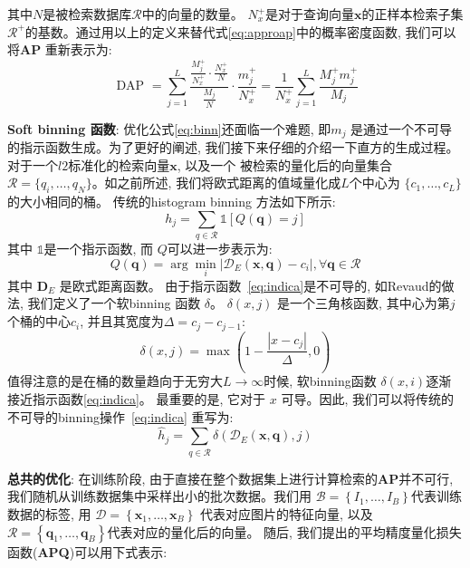 其中$N$是被检索数据库$\mathcal{R}$中的向量的数量。 $N_{x}^{+}$是对于查询向量$\mathbf{x}$的正样本检索子集 $\mathcal{R}^{+}$的基数。通过用以上的定义来替代式\ref{eq:approap}中的概率密度函数, 我们可以将\textbf{AP} 重新表示为: 
\begin{equation}
    \label{eq:binn}
    \text { DAP }=\sum_{j=1}^{L} \frac{\frac{M_{j}^{+}}{N_{x}^{+}} \cdot \frac{N_{x}^{+}}{N}}{\frac{M_{j}}{N}} \cdot \frac{m_{j}^{+}}{N_{x}^{+}}=\frac{1}{N_{x}^{+}} \sum_{j=1}^{L} \frac{M_{j}^{+} m_{j}^{+}}{M_{j}}
    \end{equation} \par
\textbf{Soft binning 函数}: 优化公式\ref{eq:binn}还面临一个难题, 即$m_j$ 是通过一个不可导的指示函数生成。为了更好的阐述, 我们接下来仔细的介绍一下直方的生成过程。 对于一个$l2$标准化的检索向量$\mathbf{x}$, 以及一个 被检索的量化后的向量集合$\mathcal{R} = \{q_i,\ldots,q_N\}$。如之前所述, 我们将欧式距离的值域量化成$L$个中心为 $\{c_1, \ldots, c_L\}$的大小相同的桶。 传统的histogram binning 方法如下所示:
\begin{equation}
    \label{eq:indica}
    h_{j}=\sum_{q \in \mathcal{R}} \mathbb{1}\left[Q(\mathbf{q})=j\right]
    \end{equation}
其中 $\mathbb{1}$是一个指示函数, 而 $Q$可以进一步表示为:
\begin{equation}
    Q(\mathbf{q})=\arg \min _{i}\left|\mathcal{D}_E\left(\mathbf{x}, \mathbf{q}\right)-c_{i}\right|, \forall \mathbf{q} \in \mathcal{R} 
\end{equation}
其中 $\mathbf{D}_E$ 是欧式距离函数。 由于指示函数~\ref{eq:indica}是不可导的, 如Revaud的做法\cite{revaud2019learning}, 我们定义了一个软binning 函数  $\delta$。 $\delta(x,j)$ 是一个三角核函数, 其中心为第$j$个桶的中心$c_i$, 并且其宽度为$\Delta = c_j - c_{j-1}$:
\begin{equation}
    \delta(x, j)=\max \left(1-\frac{\left|x-c_{j}\right|}{\Delta}, 0\right)
\end{equation}
值得注意的是在桶的数量趋向于无穷大$L \rightarrow \infty $时候, 软binning函数 $\delta(x,i)$逐渐接近指示函数\ref{eq:indica}。 最重要的是, 它对于 $x$ 可导。因此, 我们可以将传统的不可导的binning操作~\ref{eq:indica} 重写为:
\begin{equation}
    \label{eq:indicasoft}
    \hat{h}_{j}=\sum_{q \in \mathcal{R}} \delta(\mathcal{D}_E(\mathbf{x},\mathbf{q}), j)
\end{equation} \par
\textbf{总共的优化}: 在训练阶段, 由于直接在整个数据集上进行计算检索的\textbf{AP}并不可行, 我们随机从训练数据集中采样出小的批次数据。我们用 $\mathcal{B}=\left\{I_{1}, \ldots, I_{B}\right\}$代表训练数据的标签, 用 $\mathcal{D} = \left\{ \mathbf{x}_{1}, \ldots, \mathbf{x}_{B} \right\}$ 代表对应图片的特征向量, 以及$\mathcal{R} = \left\{ \mathbf{q}_{1}, \ldots, \mathbf{q}_{B} \right\}$代表对应的量化后的向量。 随后, 我们提出的平均精度量化损失函数(\textbf{APQ})可以用下式表示:
